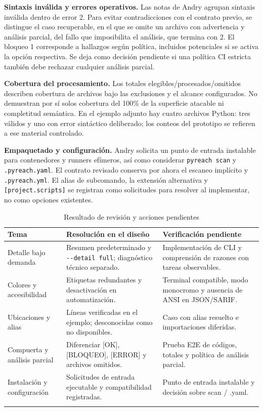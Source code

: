 \textbf{Sintaxis inválida y errores operativos.} Las notas de Andry agrupan sintaxis inválida dentro de error 2. Para evitar contradicciones con el contrato previo, se distingue el caso recuperable, en el que se omite un archivo con advertencia y análisis parcial, del fallo que imposibilita el análisis, que termina con 2. El bloqueo 1 corresponde a hallazgos según política, incluidos potenciales si se activa la opción respectiva. Se deja como decisión pendiente si una política CI estricta también debe rechazar cualquier análisis parcial.

\textbf{Cobertura del procesamiento.} Los totales elegibles/procesados/omitidos describen cobertura de archivos bajo las exclusiones y el alcance configurados. No demuestran por sí solos cobertura del 100\% de la superficie atacable ni completitud semántica. En el ejemplo adjunto hay cuatro archivos Python: tres válidos y uno con error sintáctico deliberado; los conteos del prototipo se refieren a ese material controlado.

\textbf{Empaquetado y configuración.} Andry solicita un punto de entrada instalable para contenedores y runners efímeros, así como considerar \texttt{pyreach scan} y \texttt{.\allowbreak pyreach.\allowbreak yaml}. El contrato revisado conserva por ahora el escaneo implícito y \texttt{.\allowbreak pyreach.\allowbreak yml}. El alias de subcomando, la extensión alternativa y \texttt{[project.\allowbreak scripts]} se registran como solicitudes para resolver al implementar, no como opciones existentes.

\begin{table}[H]
\centering\small{}
\caption{Resultado de revisión y acciones pendientes}
\begin{tabularx}{\textwidth}{P{3.1cm}YY}
\toprule
\textbf{Tema} & \textbf{Resolución en el diseño} & \textbf{Verificación pendiente} \\
\midrule
Detalle bajo demanda & Resumen predeterminado y \texttt{-\allowbreak -\allowbreak detail full}; diagnóstico técnico separado. & Implementación de CLI y comprensión de razones con tareas observables. \\
\addlinespace
Colores y accesibilidad & Etiquetas redundantes y desactivación en automatización. & Terminal compatible, modo monocromo y ausencia de ANSI en JSON/SARIF. \\
\addlinespace
Ubicaciones y alias & Líneas verificadas en el ejemplo; desconocidas como no disponibles. & Caso con alias resuelto e importaciones diferidas. \\
\addlinespace
Compuerta y análisis parcial & Diferenciar [OK], [BLOQUEO], [ERROR] y archivos omitidos. & Prueba E2E de códigos, totales y política de análisis parcial. \\
\addlinespace
Instalación y configuración & Solicitudes de entrada ejecutable y compatibilidad registradas. & Punto de entrada instalable y decisión sobre scan / .yaml. \\
\addlinespace
\bottomrule
\end{tabularx}
\end{table}

